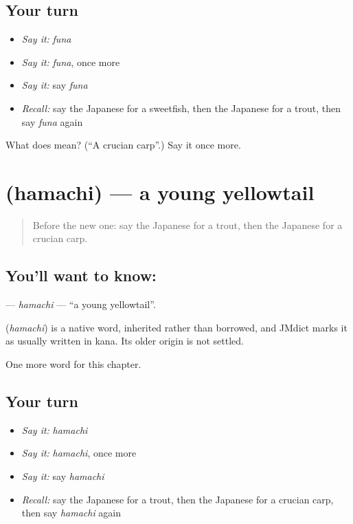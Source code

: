\subsection*{Your turn}
\begin{itemize}
\raggedright
  \item \emph{Say it:} \emph{funa}
  \item \emph{Say it:} \emph{funa}, once more
  \item \emph{Say it:} say \emph{funa}
  \item \emph{Recall:} say the Japanese for a sweetfish, then the Japanese for a trout, then say \emph{funa} again
\end{itemize}

\begin{tcolorbox}[breakable,colback=teal!4,colframe=teal!35!black,title={Before you move on}]
What does  mean? (\textquotedblleft{}A crucian carp\textquotedblright{}.) Say it once more.
\end{tcolorbox}
\section[\texorpdfstring{\ja{はまち} (hamachi)}{はまち (hamachi)}]{ (hamachi) — a young yellowtail}

\label{lesson:JA-C116-hamachi}



\begin{quote}
Before the new one: say the Japanese for a trout, then the Japanese for a crucian carp.
\end{quote}

\subsection*{You'll want to know: }
\textbf{} — \emph{hamachi} — \textquotedblleft{}a young yellowtail\textquotedblright{}.

\begin{cousinweb}
\textbf{} (\emph{hamachi}) is a native word, inherited rather than borrowed, and JMdict marks it as usually written in kana. Its older origin is not settled.
\end{cousinweb}

\begin{grammarlens}[title={What you've built}]
One more word for this chapter.
\end{grammarlens}

\subsection*{Your turn}
\begin{itemize}
\raggedright
  \item \emph{Say it:} \emph{hamachi}
  \item \emph{Say it:} \emph{hamachi}, once more
  \item \emph{Say it:} say \emph{hamachi}
  \item \emph{Recall:} say the Japanese for a trout, then the Japanese for a crucian carp, then say \emph{hamachi} again
\end{itemize}


